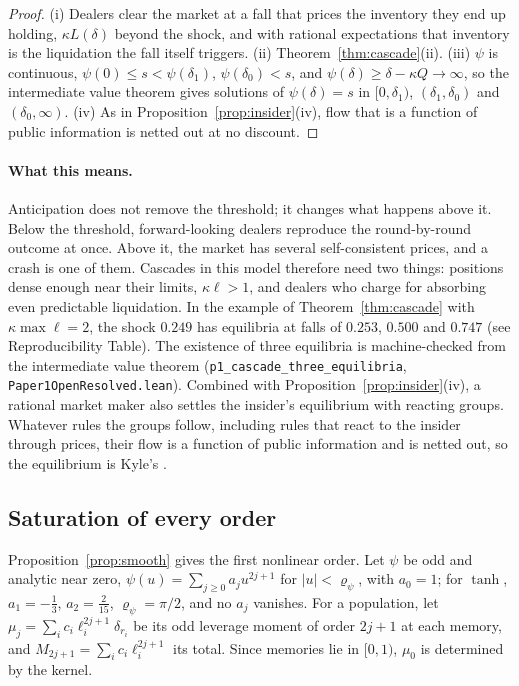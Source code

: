 \begin{proof}
(i) Dealers clear the market at a fall that prices the inventory they end up holding, $\kappa L(\delta)$ beyond the shock, and with rational expectations that inventory is the liquidation the fall itself triggers. (ii) Theorem~\ref{thm:cascade}(ii). (iii) $\psi$ is continuous, $\psi(0)\le s<\psi(\delta_1)$, $\psi(\delta_0)<s$, and $\psi(\delta)\ge\delta-\kappa Q\to\infty$, so the intermediate value theorem gives solutions of $\psi(\delta)=s$ in $[0,\delta_1)$, $(\delta_1,\delta_0)$ and $(\delta_0,\infty)$. (iv) As in Proposition~\ref{prop:insider}(iv), flow that is a function of public information is netted out at no discount.
\end{proof}

\paragraph{What this means.} Anticipation does not remove the threshold; it changes what happens above it. Below the threshold, forward-looking dealers reproduce the round-by-round outcome at once. Above it, the market has several self-consistent prices, and a crash is one of them. Cascades in this model therefore need two things: positions dense enough near their limits, $\kappa\ell>1$, and dealers who charge for absorbing even predictable liquidation. In the example of Theorem~\ref{thm:cascade} with $\kappa\max\ell=2$, the shock $0.249$ has equilibria at falls of $0.253$, $0.500$ and $0.747$ (see Reproducibility Table). The existence of three equilibria is machine-checked from the intermediate value theorem (\texttt{p1\_cascade\_three\_equilibria}, \nolinkurl{Paper1OpenResolved.lean}). Combined with Proposition~\ref{prop:insider}(iv), a rational market maker also settles the insider's equilibrium with reacting groups. Whatever rules the groups follow, including rules that react to the insider through prices, their flow is a function of public information and is netted out, so the equilibrium is Kyle's \citep{kyle1985}.

\subsection{Saturation of every order}

Proposition~\ref{prop:smooth} gives the first nonlinear order. Let $\psi$ be odd and analytic near zero, $\psi(u)=\sum_{j\ge0}a_ju^{2j+1}$ for $|u|<\varrho_\psi$, with $a_0=1$; for $\tanh$, $a_1=-\frac13$, $a_2=\frac2{15}$, $\varrho_\psi=\pi/2$, and no $a_j$ vanishes. For a population, let $\mu_j=\sum_ic_i\ell_i^{2j+1}\delta_{r_i}$ be its odd leverage moment of order $2j+1$ at each memory, and $M_{2j+1}=\sum_ic_i\ell_i^{2j+1}$ its total. Since memories lie in $[0,1)$, $\mu_0$ is determined by the kernel.

